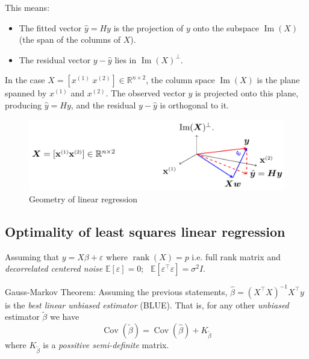 \vspace{0.2cm}

This means:
\begin{itemize}
  \item The fitted vector $\hat y = Hy$ is the projection of $y$ onto the subspace $\operatorname{Im}(X)$ (the span of the columns of $X$).
  \item The residual vector $y - \hat y$ lies in $\operatorname{Im}(X)^\perp$.
\end{itemize}

\medskip

\noindent
In the case $X = [x^{(1)} \; x^{(2)}] \in \mathbb{R}^{n\times 2}$, the column space $\operatorname{Im}(X)$ is the plane spanned by $x^{(1)}$ and $x^{(2)}$. The observed vector $y$ is projected onto this plane, producing $\hat y = Hy$, and the residual $y - \hat y$ is orthogonal to it.

\begin{figure}[htbp]
\centerline{\includegraphics[scale=.2]{figures/geometry_linearRegression.png}}
\caption{Geometry of linear regression}
\label{fig:linreg_geometry}
\end{figure}

\subsection*{Optimality of least squares linear regression}
Assuming that $y = X\beta + \varepsilon$ where $\operatorname{rank}(X) = p$ i.e. full rank matrix and \textit{decorrelated centered noise} $\mathbb{E}[\varepsilon] = 0; \text{  } \mathbb{E}[\varepsilon^\top \varepsilon] = \sigma^2I$.

\begin{theorem}
    Gauss-Markov Theorem: Assuming the previous statements, $\hat \beta = \left( X^\top X\right)^{-1} X^\top y$ is the \textit{best linear unbiased estimator} (BLUE). That is, for any other \textit{unbiased} estimator $\tilde{\beta}$ we have
    $$\operatorname{Cov}(\tilde \beta) = \operatorname{Cov} (\hat \beta) + K_{\tilde \beta}$$ where $K_{\tilde \beta}$ is a \textit{possitive semi-definite} matrix. 
\end{theorem}

